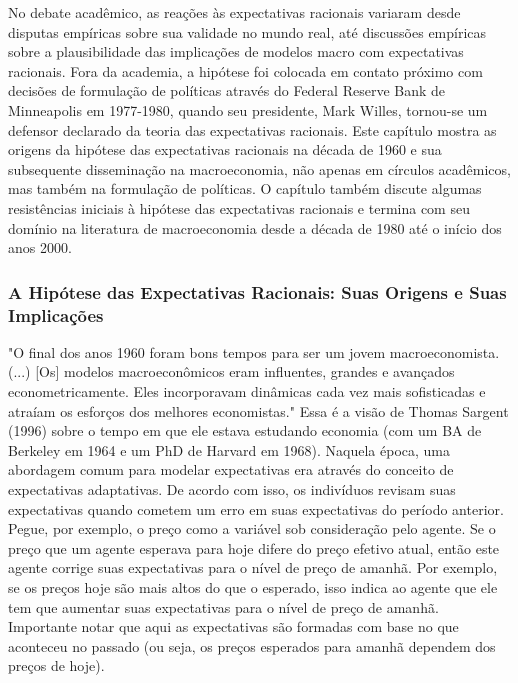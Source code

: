 \documentclass[a4paper,12pt]{article}[abntex2]
\begin{document}
No debate acadêmico, as reações às expectativas racionais variaram desde disputas empíricas sobre sua validade no mundo real, até discussões empíricas sobre a plausibilidade das implicações de modelos macro com expectativas racionais. Fora da academia, a hipótese foi colocada em contato próximo com decisões de formulação de políticas através do Federal Reserve Bank de Minneapolis em 1977-1980, quando seu presidente, Mark Willes, tornou-se um defensor declarado da teoria das expectativas racionais. Este capítulo mostra as origens da hipótese das expectativas racionais na década de 1960 e sua subsequente disseminação na macroeconomia, não apenas em círculos acadêmicos, mas também na formulação de políticas. O capítulo também discute algumas resistências iniciais à hipótese das expectativas racionais e termina com seu domínio na literatura de macroeconomia desde a década de 1980 até o início dos anos 2000.

\subsubsection{\textbf{A Hipótese das Expectativas Racionais: Suas Origens e Suas Implicações}}

"O final dos anos 1960 foram bons tempos para ser um jovem macroeconomista. (...) [Os] modelos macroeconômicos eram influentes, grandes e avançados econometricamente. Eles incorporavam dinâmicas cada vez mais sofisticadas e atraíam os esforços dos melhores economistas." Essa é a visão de Thomas Sargent (1996) sobre o tempo em que ele estava estudando economia (com um BA de Berkeley em 1964 e um PhD de Harvard em 1968). Naquela época, uma abordagem comum para modelar expectativas era através do conceito de expectativas adaptativas. De acordo com isso, os indivíduos revisam suas expectativas quando cometem um erro em suas expectativas do período anterior. Pegue, por exemplo, o preço como a variável sob consideração pelo agente. Se o preço que um agente esperava para hoje difere do preço efetivo atual, então este agente corrige suas expectativas para o nível de preço de amanhã. Por exemplo, se os preços hoje são mais altos do que o esperado, isso indica ao agente que ele tem que aumentar suas expectativas para o nível de preço de amanhã. Importante notar que aqui as expectativas são formadas com base no que aconteceu no passado (ou seja, os preços esperados para amanhã dependem dos preços de hoje).
\end{document}
